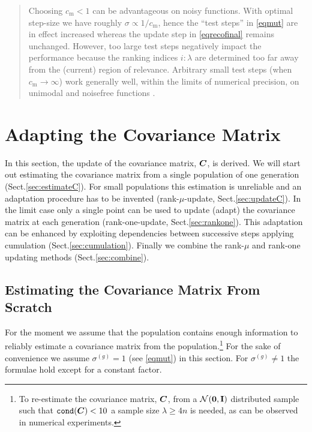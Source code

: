 \documentclass{article} %
\newenvironment{einschub}{%
\begin{small} \begin{quotation}\noindent}{%
  \vspace{0.5ex}\end{quotation}\end{small}%
}
\newcommand{\ve}[1]{\mathchoice{\mbox{\boldmath$\displaystyle#1$}}
  {\mbox{\boldmath$\textstyle#1$}} {\mbox{\boldmath$\scriptstyle#1$}}
  {\mbox{\boldmath$\scriptscriptstyle#1$}}}
\newcommand{\ma}[1]{\mathchoice{\mbox{\boldmath$\displaystyle#1$}}
  {\mbox{\boldmath$\textstyle#1$}} {\mbox{\boldmath$\scriptstyle#1$}}
  {\mbox{\boldmath$\scriptscriptstyle#1$}}}
\newcommand{\N}{\ensuremath{n}}
\newcommand{\lam}{\ensuremath{\lambda}}
\newcommand{\sig}{\ensuremath{\sigma}}
\newcommand{\sigg}{\sigma^{(g)}}
\newcommand{\Id}{\mathbf{I}}
\newcommand{\NormalNullI}{{\mathcal N}
        \hspace{-0.13em}\left({\ve{0},\Id}\right)}
\newcommand{\cm}{\ensuremath{c_\mathrm{m}}}%
\newcommand{\pref}[1]{\mbox{.\hspace{0.235em}\ref{#1}}}
\begin{document}
\begin{einschub}%
  Choosing $\cm<1$ can be advantageous on noisy functions.
  With optimal step-size we have roughly $\sig\propto1/\cm$, hence the ``test steps'' in \eqref{eqmut} are in effect increased whereas the update step in \eqref{eqrecofinal} remains unchanged.
  However, too large test steps negatively impact the performance because the ranking indices $i\!:\!\lambda$ are determined too far away from the (current) region of relevance.
  Arbitrary small test steps (when $\cm\to\infty$) work generally well, within the limits of numerical precision, on unimodal and noisefree functions \cite{akimoto2017quality,gissler2022learning}.
\end{einschub}
%

\section{Adapting the Covariance Matrix\label{secadaptC}}
In this section, the update of the covariance matrix, $\ma{C}$, is
derived. We will start out estimating the covariance matrix from a
single population of one generation (Sect\pref{sec:estimateC}). For
small populations this estimation is unreliable and an adaptation
procedure has to be invented (rank-$\mu$-update,
Sect\pref{sec:updateC}).  In the limit case only a single point can be
used to update (adapt) the covariance matrix at each generation
(rank-one-update, Sect\pref{sec:rankone}).  This adaptation can be
enhanced by exploiting dependencies between successive steps applying cumulation
(Sect\pref{sec:cumulation}). Finally we combine the rank-$\mu$ and
rank-one updating methods (Sect\pref{sec:combine}).

\subsection{Estimating the Covariance Matrix From Scratch\label{sec:estimateC}}
For the moment we assume that the population contains enough
information to reliably estimate a covariance matrix from the
population.\footnote{%
%
  To re-estimate the covariance matrix, $\ma{C}$, from a
  $\NormalNullI$ distributed sample such that $\mathtt{cond}(\ma{C})
  <10$ a sample size $\lam\ge4\N$ is needed, as can be observed in 
  numerical experiments. }
%
For the sake of convenience we assume $\sig^{(g)}= 1$ (see
\eqref{eqmut}) in this section. For $\sigg\not=1$ the formulae hold
except for a constant factor.
\end{document}
